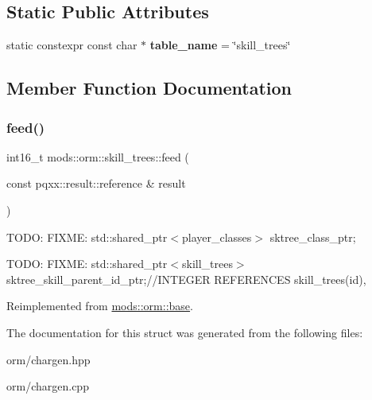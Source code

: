 \subsection*{Static Public Attributes}
\begin{DoxyCompactItemize}
\item 
\mbox{\label{structmods_1_1orm_1_1skill__trees_a8383bb4ee7a3939d9eccc91c22d7d9b3}} 
static constexpr const char $\ast$ {\bfseries table\+\_\+name} = \char`\"{}skill\+\_\+trees\char`\"{}
\end{DoxyCompactItemize}


\subsection{Member Function Documentation}
\mbox{\label{structmods_1_1orm_1_1skill__trees_af014042f1e7b8c873dcb08135e744b8a}} 
\subsubsection{\texorpdfstring{feed()}{feed()}}
{\footnotesize\ttfamily int16\+\_\+t mods\+::orm\+::skill\+\_\+trees\+::feed (\begin{DoxyParamCaption}\item[{const pqxx\+::result\+::reference \&}]{result }\end{DoxyParamCaption})\hspace{0.3cm}{\ttfamily [virtual]}}

T\+O\+DO\+: F\+I\+X\+ME\+: std\+::shared\+\_\+ptr$<$player\+\_\+classes$>$ sktree\+\_\+class\+\_\+ptr;

T\+O\+DO\+: F\+I\+X\+ME\+: std\+::shared\+\_\+ptr$<$skill\+\_\+trees$>$ sktree\+\_\+skill\+\_\+parent\+\_\+id\+\_\+ptr;//\+I\+N\+T\+E\+G\+ER R\+E\+F\+E\+R\+E\+N\+C\+ES skill\+\_\+trees(id), 

Reimplemented from \hyperlink{structmods_1_1orm_1_1base}{mods\+::orm\+::base}.



The documentation for this struct was generated from the following files\+:\begin{DoxyCompactItemize}
\item 
orm/chargen.\+hpp\item 
orm/chargen.\+cpp\end{DoxyCompactItemize}
